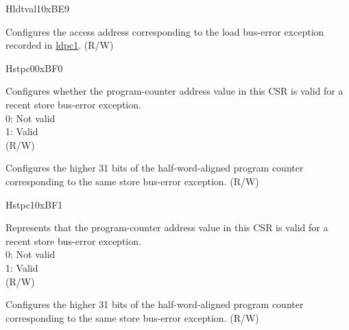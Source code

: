 \begin{register}{H}{ldtval1}{0xBE9}\label{regdesc:LDTVAL1}%
%
\regnewline%
\begin{regdesc}\begin{reglist}
\label{fielddesc:LDTVAL1_ADDR}\item [{ADDR}] Configures the access address corresponding to the load bus-error exception recorded in \hyperref[regdesc:LDPC1]{ldpc1}. (R/W)
\end{reglist}\end{regdesc}
\end{register}

\begin{register}{H}{stpc0}{0xBF0}\label{regdesc:STPC0}%
%
%
\regnewline%
\begin{regdesc}\begin{reglist}
\label{fielddesc:STPC0_VLD}\item [VLD] Configures whether the program-counter address value in this CSR is valid for a recent store bus-error exception.\\
0: Not valid\\
1: Valid\\
(R/W)
\label{fielddesc:STPC0_ADDR}\item [{ADDR}] Configures the higher 31 bits of the half-word-aligned program counter corresponding to the same store bus-error exception. (R/W)
\end{reglist}\end{regdesc}
\end{register}

\begin{register}{H}{stpc1}{0xBF1}\label{regdesc:STPC1}%
%
%
\regnewline%
\begin{regdesc}\begin{reglist}
\label{fielddesc:STPC1_VLD}\item [VLD] Represents that the program-counter address value in this CSR is valid for a recent store bus-error exception. \\
0: Not valid\\
1: Valid\\
(R/W)
\label{fielddesc:STPC1_ADDR}\item [{ADDR}] Configures the higher 31 bits of the half-word-aligned program counter corresponding to the same store bus-error exception. (R/W)
\end{reglist}\end{regdesc}
\end{register}

